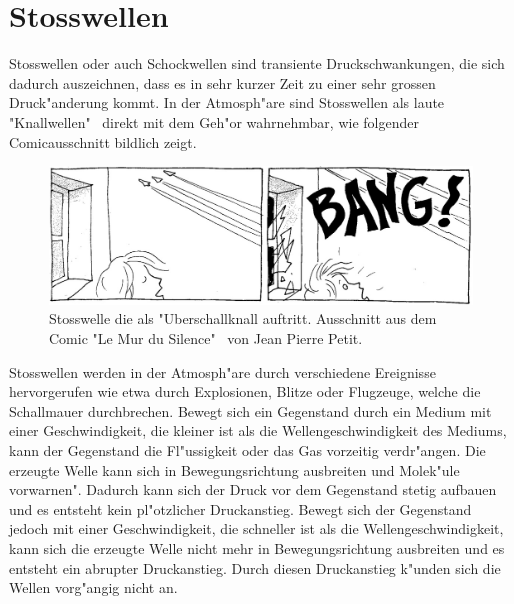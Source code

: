 \chapter{Stosswellen}
\begin{refsection}

Stosswellen oder auch Schockwellen sind transiente Druckschwankungen,
die sich dadurch auszeichnen, dass es in sehr kurzer Zeit zu einer sehr
grossen Druck"anderung kommt.
In der Atmosph"are sind Stosswellen als laute "Knallwellen" \, direkt
mit dem Geh"or wahrnehmbar, wie folgender Comicausschnitt bildlich zeigt.
\begin{figure}[h]
\begin{center}
\includegraphics[width=\hsize]{stosswellen/ueberschall.jpg}
\end{center}
\caption{Stosswelle die als "Uberschallknall auftritt. Ausschnitt aus dem Comic "Le Mur du Silence" \, von Jean Pierre Petit\cite{stoss:leMurDeSilence}.}
\label{stosswellen:ueberschall}
\end{figure}

Stosswellen werden in der Atmosph"are durch verschiedene Ereignisse
hervorgerufen wie etwa durch Explosionen, Blitze oder Flugzeuge,
welche die Schallmauer durchbrechen. Bewegt sich ein Gegenstand
durch ein Medium mit einer Geschwindigkeit, die kleiner ist als die
Wellengeschwindigkeit des Mediums, kann der Gegenstand die Fl"ussigkeit
oder das Gas vorzeitig verdr"angen. Die erzeugte Welle kann sich in
Bewegungsrichtung ausbreiten und Molek"ule \grqq vorwarnen". Dadurch
kann sich der Druck vor dem Gegenstand stetig aufbauen und es entsteht
kein pl"otzlicher Druckanstieg. Bewegt sich der Gegenstand jedoch mit
einer Geschwindigkeit, die schneller ist als die Wellengeschwindigkeit,
kann sich die erzeugte Welle nicht mehr in Bewegungsrichtung ausbreiten
und es entsteht ein abrupter Druckanstieg. Durch diesen Druckanstieg
k"unden sich die Wellen vorg"angig nicht an.


\end{refsection}

